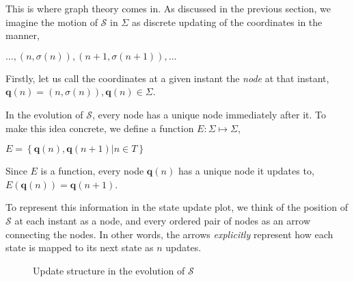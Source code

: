 \documentclass[12 pt]{article}
\begin{document}
This is where graph theory comes in. As discussed in the previous section, we imagine the motion of $\mathcal{S}$ in $\Sigma$ as discrete updating of the coordinates in the manner,

$\dots, \left( n, \sigma \left( n \right) \right), \left( n+1, \sigma \left( n+1 \right) \right), \dots$

Firstly, let us call the coordinates at a given instant the \emph{node} at that instant, $\pmb{q} \left( n \right) = \left( n, \sigma \left( n \right) \right), \pmb{q} \left( n \right) \in \Sigma$.

In the evolution of $\mathcal{S}$, every node has a unique node immediately after it. To make this idea concrete, we define a function $E : \Sigma \mapsto \Sigma$,

$E = \left\{ \pmb{q} \left( n \right), \pmb{q} \left( n+1 \right) \vert n \in T \right\}$

Since $E$ is a function, every node $\pmb{q} \left( n \right)$ has a unique node it updates to, $E \left( \pmb{q} \left( n \right) \right) = \pmb{q} \left( n+1 \right)$.

To represent this information in the state update plot, we think of the position of $\mathcal{S}$ at each instant as a node, and every ordered pair of nodes as an arrow connecting the nodes. In other words, the arrows \emph{explicitly} represent how each state is mapped to its next state as $n$ updates.

\clearpage

\begin{figure}[h]
\label{fig:2}
\centering
{}
\caption{Update structure in the evolution of $\mathcal{S}$}
\end{figure}
\end{document}
